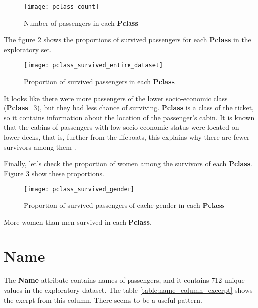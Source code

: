 \begin{figure}[!ht]
    \centering
    \texttt{[image: pclass\_count]}
    \caption{Number of passengers in each \textbf{Pclass}}
    \label{pic:pclass_count}
\end{figure}

The figure \ref{pic:pclass_survived_entire_dataset} shows the proportions
of survived passengers for each \textbf{Pclass} in the exploratory set.

\begin{figure}[!ht]
    \centering
    \texttt{[image: pclass\_survived\_entire\_dataset]}
    \caption{Proportion of survived passengers in each \textbf{Pclass}}
    \label{pic:pclass_survived_entire_dataset}
\end{figure}

It looks like there were more passengers of the lower socio-economic class 
(\textbf{Pclass}=3), but they had less chance of surviving. \textbf{Pclass}
is a class of the ticket, so it contains information about the location 
of the passenger's cabin. It is known that the cabins of passengers with 
low socio-economic status were located on lower decks, that is, further 
from the lifeboats, this explains why there are fewer survivors among them
\cite{titanic-wikipedia}.

Finally, let's check the proportion of women among the survivors of each
\textbf{Pclass}. Figure \ref{pic:pclass_survived_gender} show these 
proportions.

\begin{figure}[!ht]
    \centering
    \texttt{[image: pclass\_survived\_gender]}
    \caption{Proportion of survived passengers of eache gender in each \textbf{Pclass}}
    \label{pic:pclass_survived_gender}
\end{figure}

More women than men survived in each \textbf{Pclass}.


\section{Name} \label{section:Name}

The \textbf{Name} attribute contains names of passengers, and it contains
712 unique values in the exploratory dataset. The table 
\ref{table:name_column_excerpt} shows the exerpt from this column. There 
seems to be a useful pattern. 

